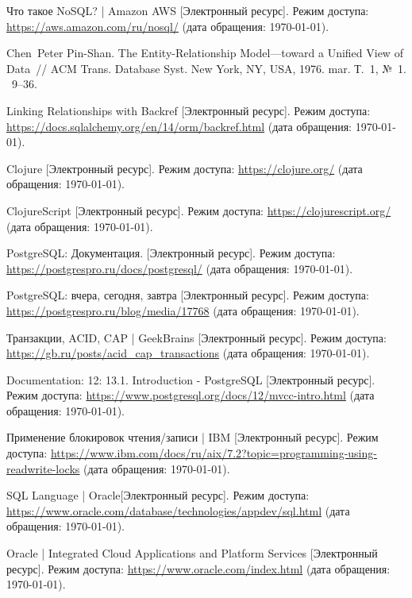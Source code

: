 \begin{thebibliography}{}
	Что такое NoSQL? | Amazon AWS [Электронный ресурс].
	\newblock Режим доступа: \url{https://aws.amazon.com/ru/nosql/}
	(дата обращения: \today).
	
	Chen~Peter Pin-Shan. The Entity-Relationship Model—toward a Unified View of
	Data~// ACM Trans. Database Syst.
	\newblock New York, NY, USA, 1976.  mar.
	\newblock Т.~1, {№}~1.
	~9–36.
	
	Linking Relationships with Backref [Электронный ресурс].
	\newblock Режим доступа:
	\url{https://docs.sqlalchemy.org/en/14/orm/backref.html} (дата
	обращения: \today).
	
	Clojure [Электронный ресурс].
	\newblock Режим доступа: \url{https://clojure.org/} (дата
	обращения: \today).
	
	ClojureScript [Электронный ресурс].
	\newblock Режим доступа: \url{https://clojurescript.org/} (дата
	обращения: \today).
	
	PostgreSQL: Документация. [Электронный ресурс].
	\newblock Режим доступа:
	\url{https://postgrespro.ru/docs/postgresql/} (дата обращения:
	\today).
	
	PostgreSQL: вчера, сегодня, завтра [Электронный
	ресурс].
	\newblock Режим доступа:
	\url{https://postgrespro.ru/blog/media/17768} (дата обращения:
	\today).
	
	Транзакции, ACID, CAP | GeekBrains [Электронный
	ресурс].
	\newblock Режим доступа:
	\url{https://gb.ru/posts/acid_cap_transactions} (дата обращения:
	\today).
	
	Documentation: 12: 13.1. Introduction - PostgreSQL [Электронный
	ресурс].
	\newblock Режим доступа:
	\url{https://www.postgresql.org/docs/12/mvcc-intro.html} (дата
	обращения: \today).
	
	Применение блокировок чтения/записи | IBM
	[Электронный ресурс].
	\newblock Режим доступа:
	\url{https://www.ibm.com/docs/ru/aix/7.2?topic=programming-using-readwrite-locks}
	(дата обращения: \today).
	
	SQL Language | Oracle[Электронный ресурс].
	\newblock Режим доступа:
	\url{https://www.oracle.com/database/technologies/appdev/sql.html} (дата
	обращения: \today).
	
	Oracle | Integrated Cloud Applications and Platform Services
	[Электронный ресурс].
	\newblock Режим доступа: \url{https://www.oracle.com/index.html}
	(дата обращения: \today).
	

\end{thebibliography}
